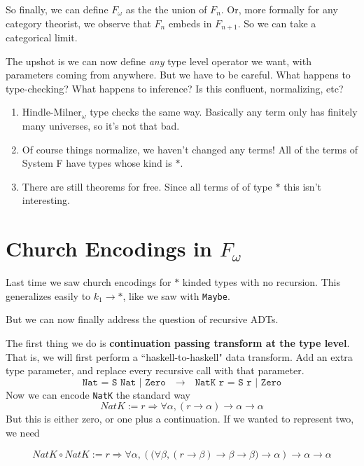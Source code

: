 \documentclass[12pt]{article}
\newcommand{\hask}{\texttt}
\begin{document}
So finally, we can define $F_\omega$ as the the union of $F_n$. 
Or, more formally for any category theorist, we observe that $F_n$ embeds in $F_{n+1}$.
So we can take a categorical limit.

The upshot is we can now define \textit{any} type level operator we want, with parameters coming from anywhere. But we have to be careful. What happens to type-checking? What happens to inference? Is this confluent, normalizing, etc?
\begin{enumerate}
    \item Hindle-Milner$_\omega$ type checks the same way. Basically any term only has finitely many universes, so it's not that bad.
    \item Of course things normalize, we haven't changed any terms! All of the terms of System F have types whose kind is $*$.
    \item There are still theorems for free. Since all terms of of type $*$ this isn't interesting.
\end{enumerate}

\section{Church Encodings in $F_\omega$}
Last time we saw church encodings for $*$ kinded types with no recursion. 
This generalizes easily to $k_1 \rightarrow *$, like we saw with \hask{Maybe}.

But we can now finally address the question of recursive ADTs.

The first thing we do is \textbf{continuation passing transform at the type level}.
That is, we will first perform a ``haskell-to-haskell" data transform.
Add an extra type parameter, and replace every recursive call with that parameter.
\[
 \hask{Nat = S Nat | Zero} \quad\longrightarrow\quad \hask{NatK r = S r | Zero}
\]
Now we can encode \hask{NatK} the standard way 
\[
  NatK := r \Rightarrow \forall \alpha, (r \rightarrow \alpha)  \rightarrow \alpha \rightarrow  \alpha
\]
But this is either zero, or one plus a continuation. 
If we wanted to represent two, we need

\[
  NatK \circ NatK := r \Rightarrow \forall \alpha, (\Big( \forall \beta, (r \rightarrow \beta)  \rightarrow \beta \rightarrow  \beta\Big) \rightarrow \alpha)  \rightarrow \alpha \rightarrow  \alpha
\]
\end{document}

